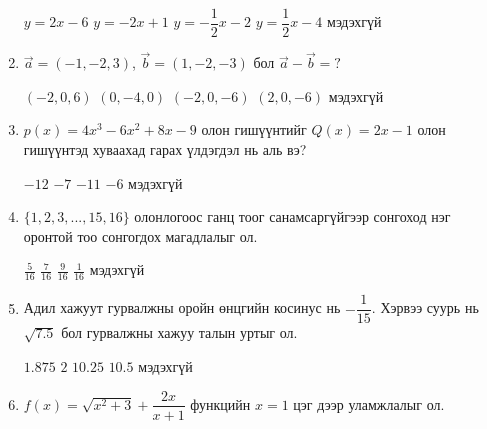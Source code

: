 \documentclass{exam}
\begin{document}
\begin{enumerate}
        \begin{oneparchoices}
            \choice $y=2x-6$
            \choice $y=-2x+1$
            \choice $y=-\dfrac{1}{2}x-2$
            \choice $y=\dfrac{1}{2}x-4$
            \choice мэдэхгүй
        \end{oneparchoices}
 
 \item $\Vec{a}=(-1,-2,3)$, $\Vec{b}=(1,-2,-3)$ бол $\Vec{a}-\Vec{b}=?$ 
    
        \begin{oneparchoices}
            \choice $(-2,0,6)$
            \choice $(0,-4,0)$
            \choice $(-2,0,-6)$
            \choice $(2,0,-6)$
            \choice мэдэхгүй
        \end{oneparchoices}
   
   \item $p(x)=4x^3-6x^2+8x-9$ олон гишүүнтийг $Q(x)=2x-1$ олон гишүүнтэд хуваахад гарах үлдэгдэл нь аль вэ?
    
        \begin{oneparchoices}
            \choice $-12$
            \choice $-7$
            \choice $-11$
            \choice $-6$
            \choice мэдэхгүй
        \end{oneparchoices}
   \item $\{1,2,3,...,15,16\}$ олонлогоос ганц тоог санамсаргүйгээр сонгоход нэг оронтой тоо сонгогдох магадлалыг ол.
    
        \begin{oneparchoices}
            \choice $\frac{5}{16}$
            \choice $\frac{7}{16}$
            \choice $\frac{9}{16}$
            \choice $\frac{1}{16}$
            \choice мэдэхгүй
        \end{oneparchoices}
    \item Адил хажуут гурвалжны оройн өнцгийн косинус нь $-\dfrac{1}{15}$. Хэрвээ суурь нь $\sqrt{7.5}$ бол гурвалжны хажуу талын уртыг ол. 
    
         \begin{oneparchoices}
            \choice $1.875$
            \choice $2$
            \choice $10.25$
            \choice $10.5$
            \choice мэдэхгүй
        \end{oneparchoices}  
    \item $f(x)=\sqrt{x^2+3}+\dfrac{2x}{x+1}$ функцийн $x=1$ цэг дээр уламжлалыг ол. 
    

\end{enumerate}
\end{document}
